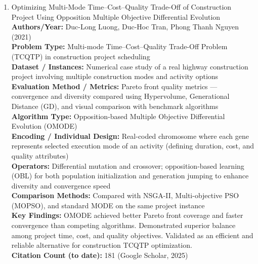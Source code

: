\documentclass[a4paper,12pt]{article}
\begin{document}
\begin{enumerate}[leftmargin=2em, labelwidth=1em, labelsep=0.5em, itemsep=1ex]
  \item Optimizing Multi-Mode Time–Cost–Quality Trade-Off of Construction Project Using Opposition Multiple Objective Differential Evolution \\
    \textbf{Authors/Year:} Duc-Long Luong, Duc-Hoc Tran, Phong Thanh Nguyen (2021) \\  
    \textbf{Problem Type:} Multi-mode Time–Cost–Quality Trade-Off Problem (TCQTP) in construction project scheduling \\  
    \textbf{Dataset / Instances:} Numerical case study of a real highway construction project involving multiple construction modes and activity options \\  
    \textbf{Evaluation Method / Metrics:} Pareto front quality metrics — convergence and diversity compared using Hypervolume, Generational Distance (GD), and visual comparison with benchmark algorithms \\  
    \textbf{Algorithm Type:} Opposition-based Multiple Objective Differential Evolution (OMODE) \\  
    \textbf{Encoding / Individual Design:} Real-coded chromosome where each gene represents selected execution mode of an activity (defining duration, cost, and quality attributes) \\  
    \textbf{Operators:} Differential mutation and crossover; opposition-based learning (OBL) for both population initialization and generation jumping to enhance diversity and convergence speed \\  
    \textbf{Comparison Methods:} Compared with NSGA-II, Multi-objective PSO (MOPSO), and standard MODE on the same project instance \\  
    \textbf{Key Findings:} OMODE achieved better Pareto front coverage and faster convergence than competing algorithms. Demonstrated superior balance among project time, cost, and quality objectives. Validated as an efficient and reliable alternative for construction TCQTP optimization. \\  
    \textbf{Citation Count (to date):} 181 (Google Scholar, 2025) \\[2ex]


\end{enumerate}
\end{document}
